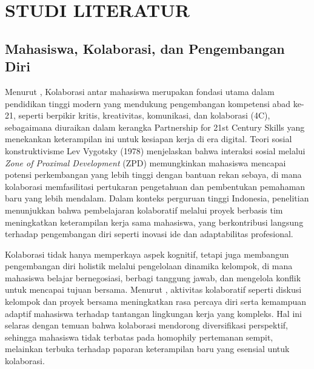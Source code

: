 \chapter{STUDI LITERATUR}
\label{chap:studi-literatur}

\section{Mahasiswa, Kolaborasi, dan Pengembangan Diri}
Menurut \textcite{novitaCOLLABORATIVELEARNINGMANIFESTATION2020}, Kolaborasi antar mahasiswa merupakan fondasi utama dalam pendidikan tinggi modern yang mendukung pengembangan kompetensi abad ke-21, seperti berpikir kritis, kreativitas, komunikasi, dan kolaborasi (4C), sebagaimana diuraikan dalam kerangka Partnership for 21st Century Skills yang menekankan keterampilan ini untuk kesiapan kerja di era digital. Teori sosial konstruktivisme Lev Vygotsky (1978) menjelaskan bahwa interaksi sosial melalui \textit{Zone of Proximal Development} (ZPD) memungkinkan mahasiswa mencapai potensi perkembangan yang lebih tinggi dengan bantuan rekan sebaya, di mana kolaborasi memfasilitasi pertukaran pengetahuan dan pembentukan pemahaman baru yang lebih mendalam. Dalam konteks perguruan tinggi Indonesia, penelitian menunjukkan bahwa pembelajaran kolaboratif melalui proyek berbasis tim meningkatkan keterampilan kerja sama mahasiswa, yang berkontribusi langsung terhadap pengembangan diri seperti inovasi ide dan adaptabilitas profesional.​

Kolaborasi tidak hanya memperkaya aspek kognitif, tetapi juga membangun pengembangan diri holistik melalui pengelolaan dinamika kelompok, di mana mahasiswa belajar bernegosiasi, berbagi tanggung jawab, dan mengelola konflik untuk mencapai tujuan bersama. Menurut \textcite{sansonePromoting21stCentury2018}, aktivitas kolaboratif seperti diskusi kelompok dan proyek bersama meningkatkan rasa percaya diri serta kemampuan adaptif mahasiswa terhadap tantangan lingkungan kerja yang kompleks. Hal ini selaras dengan temuan bahwa kolaborasi mendorong diversifikasi perspektif, sehingga mahasiswa tidak terbatas pada homophily pertemanan sempit, melainkan terbuka terhadap paparan keterampilan baru yang esensial untuk kolaborasi.​​

